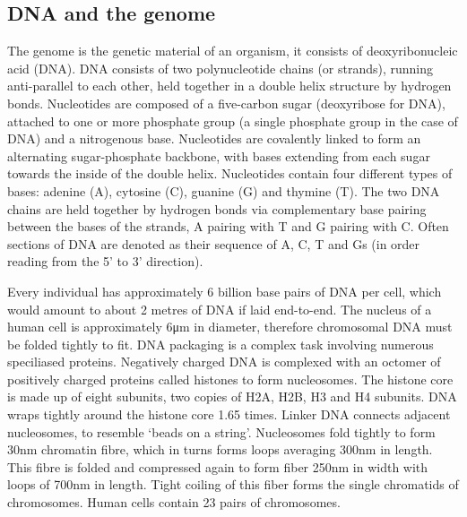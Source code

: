 \subsection{DNA and the genome}\label{subsec:dna}
The genome is the genetic material of an organism, it consists of deoxyribonucleic acid (DNA).
DNA consists of two polynucleotide chains (or strands), running anti-parallel to each other, held together in a double helix structure by hydrogen bonds.
Nucleotides are composed of a five-carbon sugar (deoxyribose for DNA), attached to one or more phosphate group (a single phosphate group in the case of DNA) and a nitrogenous base.
Nucleotides are covalently linked to form an alternating sugar-phosphate backbone, with bases extending from each sugar towards the inside of the double helix.
Nucleotides contain four different types of bases: adenine (A), cytosine (C), guanine (G) and thymine (T).
The two DNA chains are held together by hydrogen bonds via complementary base pairing between the bases of the strands, A pairing with T and G pairing with C\@.
Often sections of DNA are denoted as their sequence of A, C, T and Gs (in order reading from the 5' to 3' direction).

Every individual has approximately 6 billion base pairs of DNA per cell, which would amount to about 2 metres of DNA if laid end-to-end.
The nucleus of a human cell is approximately 6\si{\micro\meter} in diameter, therefore chromosomal DNA must be folded tightly to fit.
DNA packaging is a complex task involving numerous speciliased proteins.
Negatively charged DNA is complexed with an octomer of positively charged proteins called histones to form nucleosomes.
The histone core is made up of eight subunits, two copies of H2A, H2B, H3 and H4 subunits.
DNA wraps tightly around the histone core 1.65 times.
Linker DNA connects adjacent nucleosomes, to resemble `beads on a string'.
Nucleosomes fold tightly to form 30\si{\nm} chromatin fibre, which in turns forms loops averaging 300\si{\nm} in length.
This fibre is folded and compressed again to form fiber 250\si{\nm} in width with loops of 700\si{\nm} in length.
Tight coiling of this fiber forms the single chromatids of chromosomes\cite{annunziato2008dna, alberts2002chromosomal}.
Human cells contain 23 pairs of chromosomes.

